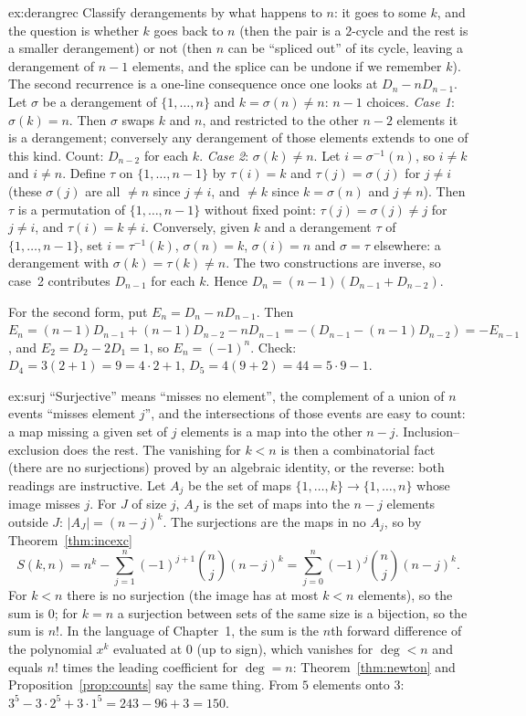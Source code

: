\begin{solution}{ex:derangrec}
\idea Classify derangements by what happens to $n$: it goes to some $k$, and the question is whether $k$ goes back to $n$ (then the pair is a $2$-cycle and the rest is a smaller derangement) or not (then $n$ can be ``spliced out'' of its cycle, leaving a derangement of $n-1$ elements, and the splice can be undone if we remember $k$). The second recurrence is a one-line consequence once one looks at $D_n-nD_{n-1}$.
\writeup Let $\sigma$ be a derangement of $\{1,\dots,n\}$ and $k=\sigma(n)\ne n$: $n-1$ choices. \emph{Case 1}: $\sigma(k)=n$. Then $\sigma$ swaps $k$ and $n$, and restricted to the other $n-2$ elements it is a derangement; conversely any derangement of those elements extends to one of this kind. Count: $D_{n-2}$ for each $k$. \emph{Case 2}: $\sigma(k)\ne n$. Let $i=\sigma^{-1}(n)$, so $i\ne k$ and $i\ne n$. Define $\tau$ on $\{1,\dots,n-1\}$ by $\tau(i)=k$ and $\tau(j)=\sigma(j)$ for $j\ne i$ (these $\sigma(j)$ are all $\ne n$ since $j\ne i$, and $\ne k$ since $k=\sigma(n)$ and $j\ne n$). Then $\tau$ is a permutation of $\{1,\dots,n-1\}$ without fixed point: $\tau(j)=\sigma(j)\ne j$ for $j\ne i$, and $\tau(i)=k\ne i$. Conversely, given $k$ and a derangement $\tau$ of $\{1,\dots,n-1\}$, set $i=\tau^{-1}(k)$, $\sigma(n)=k$, $\sigma(i)=n$ and $\sigma=\tau$ elsewhere: a derangement with $\sigma(k)=\tau(k)\ne n$. The two constructions are inverse, so case~2 contributes $D_{n-1}$ for each $k$. Hence $D_n=(n-1)(D_{n-1}+D_{n-2})$.

For the second form, put $E_n=D_n-nD_{n-1}$. Then $E_n=(n-1)D_{n-1}+(n-1)D_{n-2}-nD_{n-1}=-(D_{n-1}-(n-1)D_{n-2})=-E_{n-1}$, and $E_2=D_2-2D_1=1$, so $E_n=(-1)^n$. Check: $D_4=3(2+1)=9=4\cdot2+1$, $D_5=4(9+2)=44=5\cdot9-1$.
\end{solution}

\begin{solution}{ex:surj}
\idea ``Surjective'' means ``misses no element'', the complement of a union of $n$ events ``misses element $j$'', and the intersections of those events are easy to count: a map missing a given set of $j$ elements is a map into the other $n-j$. Inclusion--exclusion does the rest. The vanishing for $k<n$ is then a combinatorial fact (there are no surjections) proved by an algebraic identity, or the reverse: both readings are instructive.
\writeup Let $A_j$ be the set of maps $\{1,\dots,k\}\to\{1,\dots,n\}$ whose image misses $j$. For $J$ of size $j$, $A_J$ is the set of maps into the $n-j$ elements outside $J$: $|A_J|=(n-j)^k$. The surjections are the maps in no $A_j$, so by Theorem~\ref{thm:incexc}
\[
S(k,n)=n^k-\sum_{j=1}^n(-1)^{j+1}\binom nj(n-j)^k=\sum_{j=0}^n(-1)^j\binom nj(n-j)^k .
\]
For $k<n$ there is no surjection (the image has at most $k<n$ elements), so the sum is $0$; for $k=n$ a surjection between sets of the same size is a bijection, so the sum is $n!$. In the language of Chapter~1, the sum is the $n$th forward difference of the polynomial $x^k$ evaluated at $0$ (up to sign), which vanishes for $\deg<n$ and equals $n!$ times the leading coefficient for $\deg=n$: Theorem~\ref{thm:newton} and Proposition~\ref{prop:counts} say the same thing. From $5$ elements onto $3$: $3^5-3\cdot2^5+3\cdot1^5=243-96+3=150$.
\end{solution}

